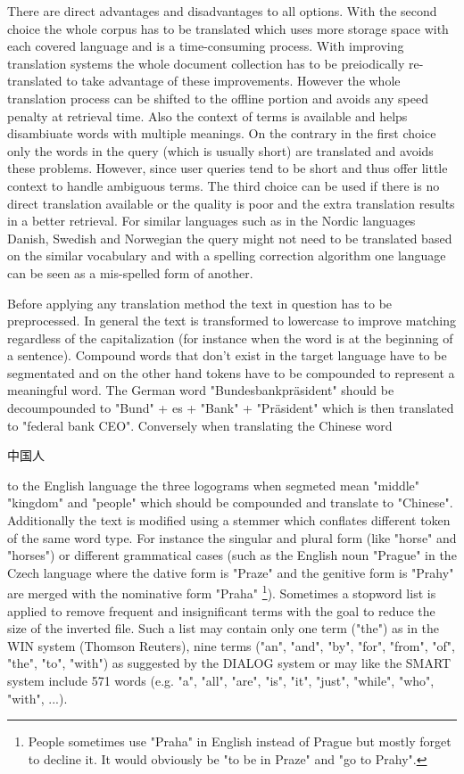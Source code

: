 \documentclass[journal]{IEEEtran}
\begin{document}
There are direct advantages and disadvantages to all options. With the second choice the whole corpus has to be translated which uses more storage space with each covered language and is a time-consuming process. With improving translation systems the whole document collection has to be preiodically re-translated to take advantage of these improvements. However the whole translation process can be shifted to the offline portion and avoids any speed penalty at retrieval time. Also the context of terms is available and helps disambiuate words with multiple meanings. On the contrary in the first choice only the words in the query (which is usually short) are translated and avoids these problems. However, since user queries tend to be short and thus offer little context to handle ambiguous terms. The third choice can be used if there is no direct translation available or the quality is poor and the extra translation results in a better retrieval. For similar languages such as in the Nordic languages Danish, Swedish and Norwegian the query might not need to be translated based on the similar vocabulary and with a spelling correction algorithm one language can be seen as a mis-spelled form of another.

Before applying any translation method the text in question has to be preprocessed. In general the text is transformed to lowercase to improve matching regardless of the capitalization (for instance when the word is at the beginning of a sentence). Compound words that don't exist in the target language have to be segmentated and on the other hand tokens have to be compounded to represent a meaningful word. The German word "Bundesbankpr\"{a}sident" should be decoumpounded to "Bund" + es + "Bank" + "Pr\"{a}sident" which is then translated to "federal bank CEO". Conversely when translating the Chinese word \begin{CJK}{UTF8}{gbsn}中国人\end{CJK} to the English language the three logograms when segmeted mean "middle" "kingdom" and "people" which should be compounded and translate to "Chinese".\cite{ir13}
Additionally the text is modified using a stemmer which conflates different token of the same word type. For instance the singular and plural form (like "horse" and "horses") or different grammatical cases (such as the English noun "Prague" in the Czech language where the dative form is "Praze" and the genitive form is "Prahy" are merged with the nominative form "Praha" \footnote{People sometimes use "Praha" in English instead of Prague but mostly forget to decline it. It would obviously be "to be in Praze" and "go to Prahy".}).
Sometimes a stopword list is applied to remove frequent and insignificant terms with the goal to reduce the size of the inverted file. Such a list may contain only one term ("the") as in the WIN system (Thomson Reuters), nine terms ("an", "and", "by", "for", "from", "of", "the", "to", "with") as suggested by the DIALOG system or may like the SMART system include 571 words (e.g. "a", "all", "are", "is", "it", "just", "while", "who", "with", ...).
\end{document}
